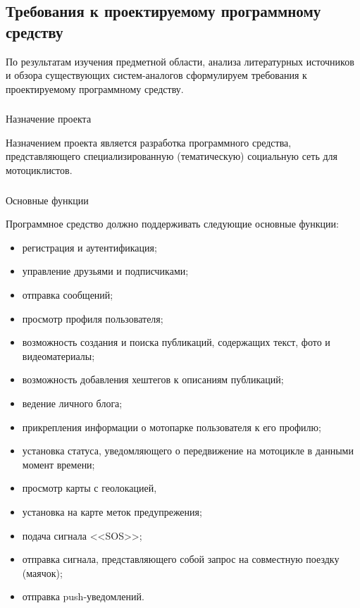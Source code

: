\subsection{Требования к проектируемому программному средству}
\label{sec:analysis:specification}

По результатам изучения предметной области, анализа литературных источников и обзора существующих систем-аналогов сформулируем требования к проектируемому программному средству.

\subsubsection{} Назначение проекта
\label{sec:analysis:specification:purpose}

Назначением проекта является разработка программного средства, представляющего специализированную (тематическую) социальную сеть для мотоциклистов.

\subsubsection{} Основные функции
\label{sec:analysis:specification:functions}

Программное средство должно поддерживать следующие основные фун\-к\-ции:

\begin{itemize}
	\item регистрация и аутентификация;
	\item управление друзьями и подписчиками;
	\item отправка сообщений;
	\item просмотр профиля пользователя;
	\item возможность создания и поиска публикаций, содержащих текст, фото и видеоматериалы;
	\item возможность добавления хештегов к описаниям публикаций;
	\item ведение личного блога;
	\item прикрепления информации о мотопарке пользователя к его профилю;
	\item установка статуса, уведомляющего о передвижение на мотоцикле в данными момент времени;
	\item просмотр карты с геолокацией,
	\item установка на карте меток предупрежения;
	\item подача сигнала <<SOS>>;
	\item отправка сигнала, представляющего собой запрос на совместную поездку (маячок); 
	\item отправка push-уведомлений.
\end{itemize}

